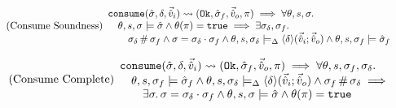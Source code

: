 %
%
%

\begin{equation}
\tag{Consume Soundness}\label{eq:consume-sound}
\begin{array}{l}
\texttt{consume}(\hat{\sigma},\delta,\vec{\hat{v}}_i)\rightsquigarrow (\texttt{Ok},\hat{\sigma}_f,\vec{\hat{v}}_o,\pi) \implies \forall \theta,s,\sigma\ldotp \\
\quad  \theta,s,\sigma\models \hat{\sigma} \land \theta(\pi)=\texttt{true} \implies \exists \sigma_\delta, \sigma_f\ldotp\\
\qquad \sigma_\delta\operatorname{\#}\sigma_f \land \sigma=\sigma_\delta\cdot\sigma_f \land \theta, s, \sigma_\delta \models_{\Delta} \left<\delta\right>\!(\vec{\hat{v}}_i;\vec{\hat{v}}_o) \land \theta,s,\sigma_f\models \hat{\sigma}_f
\end{array}
\end{equation}

\begin{equation}
\tag{Consume Complete}\label{eq:consume-complete}
\begin{array}{l}
\texttt{consume}(\hat{\sigma},\delta,\vec{\hat{v}}_i)\rightsquigarrow (\texttt{Ok},\hat{\sigma}_f,\vec{\hat{v}}_o,\pi) \implies \forall \theta,s,\sigma_f,\sigma_\delta\ldotp \\
\quad \theta,s,\sigma_f\models \hat{\sigma}_f \land \theta, s, \sigma_\delta \models_{\Delta} \left<\delta\right>\!(\vec{\hat{v}}_i;\vec{\hat{v}}_o) \land \sigma_f\operatorname{\#}\sigma_\delta \implies \\
\qquad \exists \sigma\ldotp \sigma = \sigma_\delta \cdot \sigma_f \land \theta,s,\sigma\models \hat{\sigma} \land \theta(\pi)=\texttt{true}
\end{array}
\end{equation}

